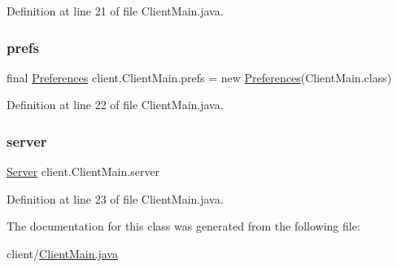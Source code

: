 Definition at line 21 of file Client\+Main.\+java.

\hypertarget{classclient_1_1_client_main_ac9b44e4112c8079879407cb8292d5fe3}{}\label{classclient_1_1_client_main_ac9b44e4112c8079879407cb8292d5fe3} 
\subsubsection{\texorpdfstring{prefs}{prefs}}
{\footnotesize\ttfamily final \hyperlink{classpt_1_1up_1_1fe_1_1lpro1613_1_1sharedlib_1_1utils_1_1_preferences}{Preferences} client.\+Client\+Main.\+prefs = new \hyperlink{classpt_1_1up_1_1fe_1_1lpro1613_1_1sharedlib_1_1utils_1_1_preferences}{Preferences}(Client\+Main.\+class)\hspace{0.3cm}{\ttfamily [static]}}



Definition at line 22 of file Client\+Main.\+java.

\hypertarget{classclient_1_1_client_main_a933025baa76b4803c185b02d359a7e15}{}\label{classclient_1_1_client_main_a933025baa76b4803c185b02d359a7e15} 
\subsubsection{\texorpdfstring{server}{server}}
{\footnotesize\ttfamily \hyperlink{classclient_1_1conn_1_1_server}{Server} client.\+Client\+Main.\+server\hspace{0.3cm}{\ttfamily [static]}}



Definition at line 23 of file Client\+Main.\+java.



The documentation for this class was generated from the following file\+:\begin{DoxyCompactItemize}
\item 
client/\hyperlink{_client_main_8java}{Client\+Main.\+java}\end{DoxyCompactItemize}
